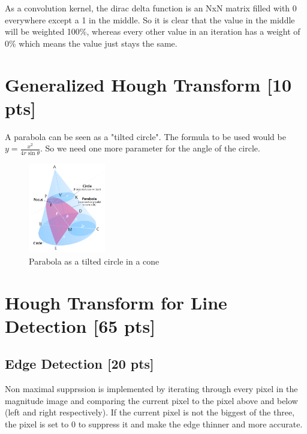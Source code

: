 \documentclass[12pt,a4paper]{article}
\begin{document}
As a convolution kernel, the dirac delta function is an NxN matrix filled with 0 everywhere except a 1 in the middle. So it is clear that the value in the middle will be weighted 100\%, whereas every other value in an iteration has a weight of 0\% which means the value just stays the same.


\section{Generalized Hough Transform [10 pts]}

A parabola can be seen as a "tilted circle". The formula to be used would be $y={\frac {x^{2}}{4r\sin {\theta }}}$.
So we need one more parameter for the angle of the circle.

\begin{figure}[!h]
    \begin{center}
        \includegraphics[width=0.3\textwidth]{assets/parabola.png}
        \caption{Parabola as a tilted circle in a cone \cite{parabola}}
        \label{fig:parabola}
    \end{center}
\end{figure}



\section{Hough Transform for Line Detection [65 pts]}


\subsection{Edge Detection [20 pts]}
Non maximal supprssion is implemented by iterating through every pixel in the magnitude image and comparing the current pixel to the pixel above and below (left and right respectively). If the current pixel is not the biggest of the three, the pixel is set to 0 to suppress it and make the edge thinner and more accurate.
\end{document}
